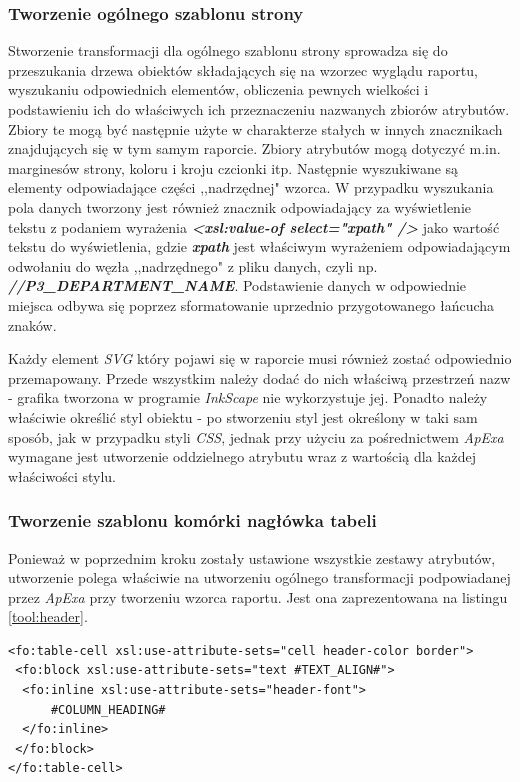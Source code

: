 \documentclass[11pt,a4paper]{article}
\begin{document}
\subsubsection{Tworzenie ogólnego szablonu strony}
Stworzenie transformacji dla ogólnego szablonu strony sprowadza się do przeszukania drzewa obiektów składających się na wzorzec wyglądu raportu, wyszukaniu odpowiednich elementów, obliczenia pewnych wielkości i podstawieniu ich do właściwych ich przeznaczeniu nazwanych zbiorów atrybutów. Zbiory te mogą być następnie użyte w charakterze stałych w innych znacznikach znajdujących się w tym samym raporcie. Zbiory atrybutów mogą dotyczyć m.in. marginesów strony, koloru i kroju czcionki itp. Następnie wyszukiwane są elementy odpowiadające części ,,nadrzędnej" wzorca. W przypadku wyszukania pola danych tworzony jest również znacznik odpowiadający za wyświetlenie tekstu z podaniem wyrażenia \textbf{\emph{\textless xsl:value-of select="xpath" /\textgreater}} jako wartość tekstu do wyświetlenia, gdzie \textbf{\emph{xpath}} jest właściwym wyrażeniem odpowiadającym odwołaniu do węzła ,,nadrzędnego" z pliku danych, czyli np. \textbf{\emph{//P3\_DEPARTMENT\_NAME}}. Podstawienie danych w odpowiednie miejsca odbywa się poprzez sformatowanie uprzednio przygotowanego łańcucha znaków.

Każdy element \emph{SVG} który pojawi się w raporcie musi również zostać odpowiednio przemapowany. Przede wszystkim należy dodać do nich właściwą przestrzeń nazw - grafika tworzona w programie \emph{InkScape} nie wykorzystuje jej. Ponadto należy właściwie określić styl obiektu - po stworzeniu styl jest określony w taki sam sposób, jak w przypadku styli \emph{CSS}, jednak przy użyciu za pośrednictwem \emph{ApExa} wymagane jest utworzenie oddzielnego atrybutu wraz z wartością dla każdej właściwości stylu.

\subsubsection{Tworzenie szablonu komórki nagłówka tabeli} \label{table:header}
Ponieważ w poprzednim kroku zostały ustawione wszystkie zestawy atrybutów, utworzenie polega właściwie na utworzeniu ogólnego transformacji podpowiadanej przez \emph{ApExa} przy tworzeniu wzorca raportu. Jest ona zaprezentowana na listingu \ref{tool:header}.

\lstset{language=XSLT}
\begin{lstlisting}[frame=single,caption=Transformacja dla nagłówka tabeli, label=tool:header]
<fo:table-cell xsl:use-attribute-sets="cell header-color border">
 <fo:block xsl:use-attribute-sets="text #TEXT_ALIGN#">
  <fo:inline xsl:use-attribute-sets="header-font">
      #COLUMN_HEADING#
  </fo:inline>
 </fo:block>
</fo:table-cell>
\end{lstlisting}
\end{document}
